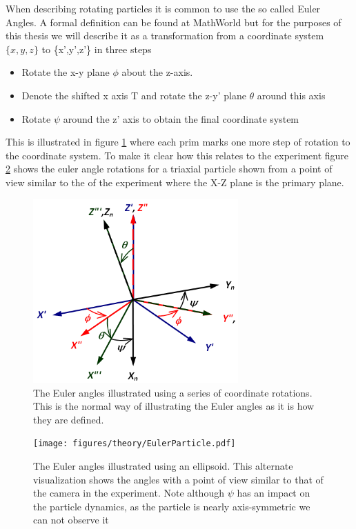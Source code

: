 When describing rotating particles it is common to use the so called Euler Angles. A formal definition can be found at MathWorld \cite{eulerAngles} but for the purposes of this thesis we will describe it as a transformation from a coordinate system $\{x,y,z\}$ to \{x',y',z'\} in three steps

\begin{itemize}
\item Rotate the x-y plane $\phi$ about the z-axis.
\item Denote the shifted x axis T and rotate the z-y' plane $\theta$ around this axis
\item Rotate $\psi$ around the z' axis to obtain the final coordinate system
\end{itemize}

This is illustrated in figure \ref{fig:eulerangles} where each prim marks one more step of rotation to the coordinate system. To make it clear how this relates to the experiment figure \ref{fig:eulerparticle} shows the euler angle rotations for a triaxial particle shown from a point of view similar to the of the experiment where the X-Z plane is the primary plane. 

\begin{figure}
\begin{center}
\includegraphics[width=0.7\textwidth]{figures/theory/eulerangles.png}
\end{center}
\caption{The Euler angles illustrated using a series of coordinate rotations. This is the normal way of illustrating the Euler angles as it is how they are defined.}
\label{fig:eulerangles}
\end{figure}


\begin{figure}
\begin{center}
\texttt{[image: figures/theory/EulerParticle.pdf]}
\end{center}
\caption{The Euler angles illustrated using an ellipsoid. This alternate visualization shows the angles with a point of view similar to that of the camera in the experiment. Note although $\psi$ has an impact on the particle dynamics, as the particle is nearly axis-symmetric we can not observe it}
\label{fig:eulerparticle}
\end{figure}

